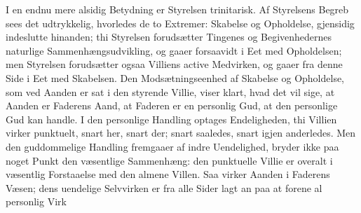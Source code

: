 \documentclass[12pt]{book}
\begin{document}
I en endnu mere alsidig Betydning er Styrelsen trinitarisk. Af
Styrelsens Begreb sees det udtrykkelig, hvorledes de to Extremer:
Skabelse og Opholdelse, gjensidig indeslutte hinanden; thi Styrelsen
forudsætter Tingenes og Begivenhedernes naturlige
Sammenhængsudvikling, og gaaer forsaavidt i Eet med Opholdelsen; men
Styrelsen forudsætter ogsaa Villiens active Medvirken, og gaaer fra
denne Side i Eet med Skabelsen. Den Modsætningseenhed af Skabelse og
Opholdelse, som ved Aanden er sat i den styrende Villie, viser
klart, hvad det vil sige, at Aanden er Faderens Aand, at Faderen er
en personlig Gud, at den personlige Gud kan handle. I den personlige
Handling optages Endeligheden, thi Villien virker punktuelt, snart
her, snart der; snart saaledes, snart igjen anderledes. Men den
guddommelige Handling fremgaaer af indre Uendelighed, bryder ikke
paa noget Punkt den væsentlige Sammenhæng: den punktuelle Villie er
overalt i væsentlig Forstaaelse med den almene Villen. Saa virker
Aanden i Faderens Væsen; dens uendelige Selvvirken er fra alle Sider
lagt an paa at forene al personlig Virk\-
\end{document}
